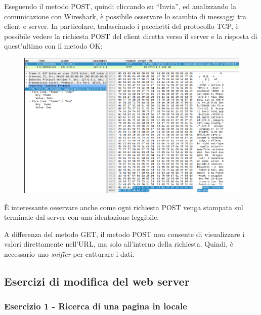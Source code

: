 \documentclass[a4paper]{article}
\newcommand{\dquotes}[1]{``#1''}
\begin{document}
	\noindent
	Eseguendo il metodo POST, quindi cliccando su \dquotes{Invia}, ed analizzando la comunicazione con Wireshark, è possibile osservare lo scambio di messaggi tra client e server. In particolare, tralasciando i pacchetti del protocollo TCP, è possibile vedere la richiesta POST del client diretta verso il server e la risposta di quest'ultimo con il metodo OK:
	\begin{figure}[!htp]
		\centering
		\includegraphics[width=\textwidth]{img/web-server/web-server-3.png}
	\end{figure}
	
	\noindent
	È interessante osservare anche come ogni richiesta POST venga stampata sul terminale dal server con una identazione leggibile.\newline
	
	\noindent
	A differenza del metodo GET, il metodo POST non consente di visualizzare i valori direttamente nell'URL, ma solo all'interno della richiesta. Quindi, è necessario uno \emph{sniffer} per catturare i dati.\newpage
	
	\subsection[\textcolor{Red3}{\textbf{Esercizi}} di modifica del web server]{Esercizi di modifica del web server}
	
	\subsubsection{Esercizio 1 - Ricerca di una pagina in locale}
	
\end{document}
